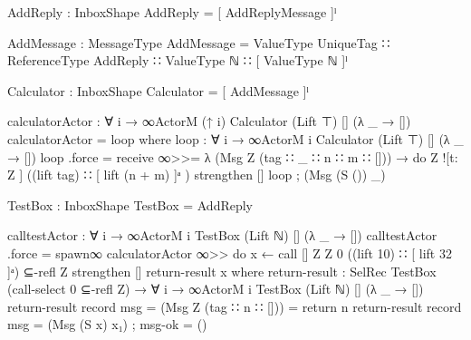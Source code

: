 \begin{code}
AddReply : InboxShape
AddReply = [ AddReplyMessage ]ˡ

AddMessage : MessageType
AddMessage = ValueType UniqueTag ∷ ReferenceType AddReply ∷ ValueType ℕ ∷ [ ValueType ℕ ]ˡ

Calculator : InboxShape
Calculator = [ AddMessage ]ˡ

calculatorActor : ∀ {i} → ∞ActorM (↑ i) Calculator (Lift ⊤) [] (λ _ → [])
calculatorActor = loop
  where
    loop : ∀ {i} → ∞ActorM i Calculator (Lift ⊤) [] (λ _ → [])
    loop .force = receive ∞>>= λ {
      (Msg Z (tag ∷ _ ∷ n ∷ m ∷ [])) → do
        Z ![t: Z ] ((lift tag) ∷ [ lift (n + m) ]ᵃ )
        strengthen []
        loop
      ; (Msg (S ()) _) }

TestBox : InboxShape
TestBox = AddReply

calltestActor : ∀ {i} → ∞ActorM i TestBox (Lift ℕ) [] (λ _ → [])
calltestActor .force = spawn∞ calculatorActor ∞>> do
    x ← call [] Z Z 0
         ((lift 10) ∷ [ lift 32 ]ᵃ)
         ⊆-refl Z
    strengthen []
    return-result x
  where
    return-result : SelRec TestBox (call-select 0 ⊆-refl Z) →
                    ∀ {i} → ∞ActorM i TestBox (Lift ℕ) [] (λ _ → [])
    return-result record { msg = (Msg Z (tag ∷ n ∷ [])) } = return n
    return-result record { msg = (Msg (S x) x₁) ; msg-ok = () }

\end{code}
